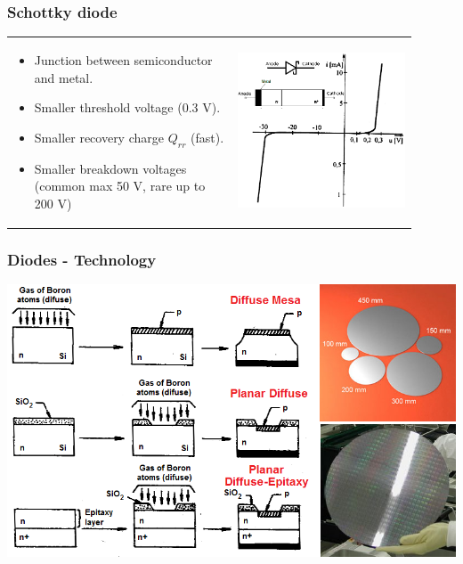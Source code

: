 \documentclass{beamer}
\begin{document}
	\begin{frame}
    \frametitle{Schottky diode}
		\begin{tabular}{m{0.5\linewidth} m{0.4\linewidth}}
		\small
		\begin{itemize}
			\item Junction between semiconductor and metal.
			\item Smaller threshold voltage (0.3 V).
			\item Smaller recovery charge $Q_{rr}$ (fast).
			\item Smaller breakdown voltages (common max 50 V, rare up to 200 V)
		\end{itemize}
		 &
		\includegraphics[scale=0.35]{obr12_schottkyDioda.png} 
		\end{tabular}
	\end{frame}
	\begin{frame}
    \frametitle{Diodes - Technology}
		\begin{center}
			\includegraphics[scale=0.45]{obr11_vyrobaPN.png} 
		\end{center}
	\end{frame}
\end{document}
